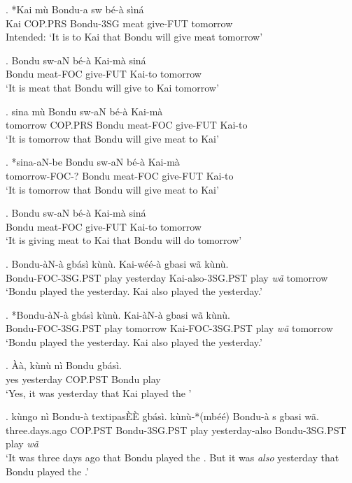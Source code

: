 \documentclass{assets/fieldnotes}
\begin{document}
\exg. *Kai mù Bondu-a sw bé-à sìná\\
Kai COP.PRS Bondu-3SG meat give-FUT tomorrow\\
Intended: `It is to Kai that Bondu will give meat tomorrow'

\exg. Bondu sw-aN bé-à Kai-mà siná\\
Bondu meat-FOC give-FUT Kai-to tomorrow\\
`It is meat that Bondu will give to Kai tomorrow'

\exg. sina mù Bondu sw-aN bé-à Kai-mà\\
tomorrow COP.PRS Bondu meat-FOC give-FUT Kai-to\\
`It is tomorrow that Bondu will give meat to Kai'

\exg. *sina-aN-be Bondu sw-aN bé-à Kai-mà\\
tomorrow-FOC-? Bondu meat-FOC give-FUT Kai-to\\
`It is tomorrow that Bondu will give meat to Kai'

\exg. Bondu sw-aN bé-à Kai-mà siná\\
Bondu meat-FOC give-FUT Kai-to tomorrow\\
`It is giving meat to Kai that Bondu will do tomorrow'

\exg. Bondu-àN-à  gbásì kùnù. Kai-wéé-à  gbasi wã kùnù.\\
Bondu-FOC-3SG.PST  play yesterday Kai-also-3SG.PST  play \textit{wã} tomorrow\\
`Bondu played the  yesterday. Kai also played the  yesterday.'

\exg. *Bondu-àN-à  gbásì kùnù. Kai-àN-à  gbasi wã kùnù.\\
Bondu-FOC-3SG.PST  play tomorrow Kai-FOC-3SG.PST  play \textit{wã} tomorrow\\
`Bondu played the  yesterday. Kai also played the  yesterday.'

\exg. Àà, kùnù nì Bondu  gbásì.\\
yes yesterday COP.PST Bondu  play\\
`Yes, it was yesterday that Kai played the '

\exg. kùngo nì Bondu-à textipa{s\`E\`E} gbásì. kùnù-*(mbéé) Bondu-à s gbasi wã.\\
three.days.ago COP.PST Bondu-3SG.PST  play yesterday-also Bondu-3SG.PST  play \textit{wã}\\
`It was three days ago that Bondu played the . But it was \textit{also} yesterday that Bondu played the .'
\end{document}
